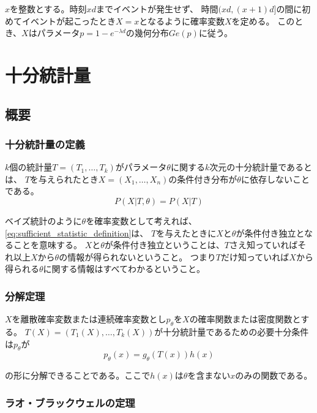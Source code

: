 \(x\)を整数とする。時刻\(xd\)までイベントが発生せず、
時間\((xd, (x+1)d]\)の間に初めてイベントが起こったとき\(X=x\)となるように確率変数\(X\)を定める。
このとき、\(X\)はパラメータ\(p = 1 - e^{-\lambda d}\)の幾何分布\(Ge(p)\)に従う。

\section{十分統計量}

\subsection{概要}

\subsubsection{十分統計量の定義}

\(k\)個の統計量\(T = ( T_1, \dots, T_k )\)がパラメータ\(\theta\)に関する\(k\)次元の十分統計量であるとは、
\(T\)を与えられたとき\(X = ( X_1, \dots, X_n )\)の条件付き分布が\(\theta\)に依存しないことである。
\begin{equation} \label{eq:sufficient_statistic_definition}
  P(X | T, \theta) = P(X | T)
\end{equation}


ベイズ統計のように\(\theta\)を確率変数として考えれば、\cref{eq:sufficient_statistic_definition}は、
\(T\)を与えたときに\(X\)と\(\theta\)が条件付き独立となることを意味する。
\(X\)と\(\theta\)が条件付き独立ということは、\(T\)さえ知っていればそれ以上\(X\)から\(\theta\)の情報が得られないということ。
つまり\(T\)だけ知っていれば\(X\)から得られる\(\theta\)に関する情報はすべてわかるということ。

\subsubsection{分解定理}

\(X\)を離散確率変数または連続確率変数とし\(p_\theta\)を\(X\)の確率関数または密度関数とする。
\(T(X) = ( T_1(X), \dots, T_k(X))\)が十分統計量であるための必要十分条件は\(p_\theta\)が
\begin{equation}
  p_\theta (x) = g_\theta (T(x)) h(x)
\end{equation}

の形に分解できることである。ここで\(h(x)\)は\(\theta\)を含まない\(x\)のみの関数である。

\subsubsection{ラオ・ブラックウェルの定理}

